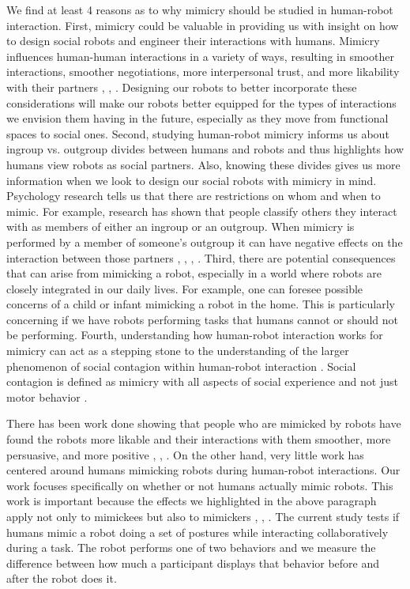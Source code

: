 \documentclass{acm_proc_article-sp}
\begin{document}
We find at least 4 reasons as to why mimicry should be studied in human-robot interaction. First, mimicry could be valuable in providing us with insight on how to design social robots and engineer their interactions with humans. Mimicry influences human-human interactions in a variety of ways, resulting in smoother interactions, smoother negotiations, more interpersonal trust, and more likability with their partners \cite{maddux2008chameleons}, \cite{stel2010mimicry}, \cite{swaab2011early}. Designing our robots to better incorporate these considerations will make our robots better equipped for the types of interactions we envision them having in the future, especially as they move from functional spaces to social ones. Second, studying human-robot mimicry informs us about ingroup vs. outgroup divides between humans and robots and thus highlights how humans view robots as social partners. Also, knowing these divides gives us more information when we look to design our social robots with mimicry in mind. Psychology research tells us that there are restrictions on whom and when to mimic. For example, research has shown that people classify others they interact with as members of either an ingroup or an outgroup. When mimicry is performed by a member of someone's outgroup it can have negative effects on the interaction between those partners \cite{bourgeois2008impact}, \cite{chartrand2013antecedents}, \cite{kavanagh2011s}, \cite{yabar2006implicit}. Third, there are potential consequences that can arise from mimicking a robot, especially in a world where robots are closely integrated in our daily lives. For example, one can foresee possible concerns of a child or infant mimicking a robot in the home. This is particularly concerning if we have robots performing tasks that humans cannot or should not be performing. Fourth, understanding how human-robot interaction works for mimicry can act as a stepping stone to the understanding of the larger phenomenon of social contagion within human-robot interaction \cite{chartrand2013antecedents}. Social contagion is defined as mimicry with all aspects of social experience and not just motor behavior \cite{chartrand2013antecedents}.

There has been work done showing that people who are mimicked by robots have found the robots more likable and their interactions with them smoother, more persuasive, and more positive \cite{bailenson2005digital}, \cite{chartrand2013antecedents}, \cite{riek2010my}. On the other hand, very little work has centered around humans mimicking robots during human-robot interactions. Our work focuses specifically on whether or not humans actually mimic robots. This work is important because the effects we highlighted in the above paragraph apply not only to mimickees but also to mimickers \cite{maddux2008chameleons}, \cite{stel2010mimicry}, \cite{swaab2011early}. The current study tests if humans mimic a robot doing a set of postures while interacting collaboratively during a task. The robot performs one of two behaviors and we measure the difference between how much a participant displays that behavior before and after the robot does it.  
\end{document}
